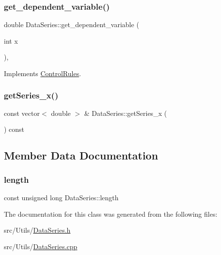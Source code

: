 \mbox{\label{classDataSeries_a57c3737304a489a3ae9cae5910fc5337}} 
\subsubsection{\texorpdfstring{get\+\_\+dependent\+\_\+variable()}{get\_dependent\_variable()}\hspace{0.1cm}{\footnotesize\ttfamily [2/2]}}
{\footnotesize\ttfamily double Data\+Series\+::get\+\_\+dependent\+\_\+variable (\begin{DoxyParamCaption}\item[{int}]{x }\end{DoxyParamCaption})\hspace{0.3cm}{\ttfamily [override]}, {\ttfamily [virtual]}}



Implements \mbox{\hyperlink{classControlRules}{Control\+Rules}}.

\mbox{\label{classDataSeries_a0a1f6248bc7bed18587e28f307066307}} 
\subsubsection{\texorpdfstring{get\+Series\+\_\+x()}{getSeries\_x()}}
{\footnotesize\ttfamily const vector$<$ double $>$ \& Data\+Series\+::get\+Series\+\_\+x (\begin{DoxyParamCaption}{ }\end{DoxyParamCaption}) const}



\subsection{Member Data Documentation}
\mbox{\label{classDataSeries_ad4a99b265519d2f57b787c03f2cf2f83}} 
\subsubsection{\texorpdfstring{length}{length}}
{\footnotesize\ttfamily const unsigned long Data\+Series\+::length}



The documentation for this class was generated from the following files\+:\begin{DoxyCompactItemize}
\item 
src/\+Utils/\mbox{\hyperlink{DataSeries_8h}{Data\+Series.\+h}}\item 
src/\+Utils/\mbox{\hyperlink{DataSeries_8cpp}{Data\+Series.\+cpp}}\end{DoxyCompactItemize}
